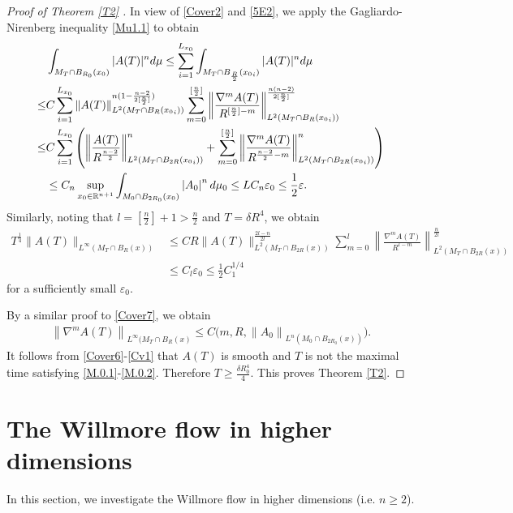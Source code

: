 \documentclass{amsart}
\theoremstyle{definition}
\def\R{{\Bbb R}}
\numberwithin{equation}{section}
\begin{document}
\begin{proof}[Proof of Theorem   \ref{T2} ]
In view of \eqref{Cover2} and \eqref{5E2}, we apply the Gagliardo-Nirenberg  inequality \eqref{Mu1.1} to obtain
\begin{align}\label {Cover6}
 &\int_{ M_T\cap B_{R_0}(x_0)} |A(T)|^{n}d\mu\leq \sum_{i=1}^{L_{x_0}}  \int_{M_T\cap  B_{\frac R 2}({x_0}_i)} |A(T)|^{n}d\mu \\
 \leq  &C \sum_{i=1}^{L_{x_0}}  \| A (T)\|^{n(1-\frac {n-2}{2[\frac n2]}) }_{L^2(M_T\cap B_{R}({x_0}_i))}\sum_{m=0}^{[\frac n2]}\left \|\frac {\nabla^{m}
A(T)}{R^{[\frac n2] -m}}\right \|^{ \frac {n(n-2)}{2[\frac n2]}}_{L^2(M_T\cap B_{R}({x_0}_i) )}
\nonumber \\
 \leq  &C \sum_{i=1}^{L_{x_0}} \left (\left  \|\frac { A(T)}{R^{\frac {n-2}2}}\right  \|^{n }_{L^2(M_T\cap B_{2R}({x_0}_i))}+\sum_{m=0}^{[\frac n2]}\left \|\frac {\nabla^{m}
A(T)}{R^{\frac {n-2}2 -m}}\right \|^{n}_{L^2(M_T\cap B_{2R}({x_0}_i) )}\right )
\nonumber \\
&\leq C_n  \sup_{x_0\in\R^{n+1}} \int_{M_0\cap B_{2 R_0}({x_0})} \left| A_{0} \right|^{n} d\mu_{0}\leq L C_n \varepsilon_0\leq \frac 1 2 \varepsilon. \nonumber
\end{align}
 Similarly,  noting that $l=[\frac n2 ]+1> \frac n 2$ and $T=\delta R^4$, we obtain
  \begin{align}\label{Cover7}
T^{\frac 1 4}\|A (T)\|_{L^{\infty}(M_T\cap B_{R}(x))}&\leq CR\| A(T)\|^{\frac {2l-n}  {2l} }_{L^2(M_T\cap B_{2R}(x))}\sum_{m=0}^{l}
\left \|\frac {\nabla^m A(T)}{R^{l -m}}\right \|^{\frac n
{2l}}_{L^2(M_T\cap B_{2R}(x))}\\
&\leq C_l   \varepsilon_0 \leq \frac 1{2} C_1^{1/4}  \nonumber
\end{align}
for a sufficiently small $\varepsilon_0$.




 By  a similar proof to \eqref{Cover7}, we  obtain
  \begin{align}\label{Cv1}
  \left\| \nabla^{m} A(T) \right\|_{L^{\infty}(M_T\cap  B_{R}(x)} \leq C\big (m, R, \left\|   A_{0} \right\|_{L^n( M_0\cap B_{2R_0}(x) )} \big ) \mbox{.} \end{align}
It follows from \eqref{Cover6}-\eqref{Cv1} that $A(T)$ is smooth and $T$ is not the maximal time satisfying \eqref{M.0.1}-\eqref{M.0.2}.  Therefore $T\geq \frac {\delta R_0^4}4$. This proves Theorem  \ref{T2}.
 \end{proof}


\section{The   Willmore flow in higher dimensions}
In this section, we investigate the Willmore flow in higher dimensions (i.e. $n\geq 2$).
\end{document}
